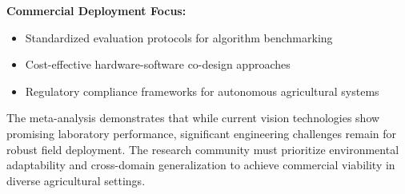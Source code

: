 \textbf{Commercial Deployment Focus:}
\begin{itemize}
    \item Standardized evaluation protocols for algorithm benchmarking
    \item Cost-effective hardware-software co-design approaches
    \item Regulatory compliance frameworks for autonomous agricultural systems
\end{itemize}

The meta-analysis demonstrates that while current vision technologies show promising laboratory performance, significant engineering challenges remain for robust field deployment. The research community must prioritize environmental adaptability and cross-domain generalization to achieve commercial viability in diverse agricultural settings.